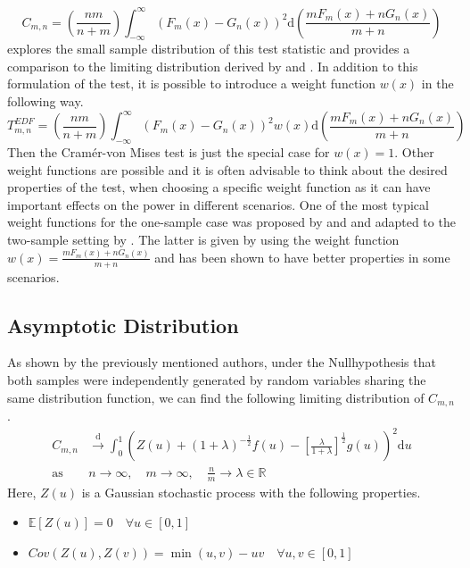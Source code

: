 \documentclass[12pt, a4paper]{article}
\theoremstyle{MAstyle} \newtheorem{assumption}{Assumption}[section]
\theoremstyle{MAstyle} \newtheorem{definition}{Definition}[section]
\theoremstyle{MAstyle} \newtheorem{theorem}{Theorem}[section]
\begin{document}
			\cite{buning_nichtparametrische_2013}
			\begin{equation}
				C_{m,n} = \left(\frac{nm}{n+m}\right) \int_{-\infty}^{\infty}\left(F_{m}(x) - G_{n}(x)\right)^{2} \mathrm{d} \left(\frac{m F_{m}(x) + n G_{n}(x)}{m+n}\right)
			\end{equation}
			\cite{anderson_distribution_1962} explores the small sample distribution of this test statistic and provides a comparison to the limiting distribution derived by \cite{rosenblatt_limit_1952} and \cite{fisz_result_1960}.
			In addition to this formulation of the test, it is possible to introduce a weight function $w(x)$ in the following way. 
			\begin{equation}
				T^{\textit{EDF}}_{m,n} = \left(\frac{nm}{n+m}\right) \int_{-\infty}^{\infty}\left(F_{m}(x) - G_{n}(x)\right)^{2} w(x) \mathrm{d} \left(\frac{m F_{m}(x) + n G_{n}(x)}{m+n}\right)
			\end{equation}
			Then the Cram\'{e}r-von Mises test is just the special case for $w(x) = 1$. Other weight functions are possible and it is often advisable to think about the desired properties of the test, when choosing a specific weight function as it can have important effects on the power in different scenarios. One of the most typical weight functions for the one-sample case was proposed by \cite{anderson_asymptotic_1952} and \cite{anderson_test_1954} and adapted to the two-sample setting by \cite{pettitt_two-sample_1976}. The latter is given by using the weight function $w(x) = \frac{m F_m(x) + n G_n(x)}{m+n}$ and has been shown to have better properties in some scenarios.
		
		\subsection{Asymptotic Distribution}
			As shown by the previously mentioned authors, under the Nullhypothesis that both samples were independently generated by random variables sharing the same distribution function, we can find the following limiting distribution of $C_{m,n}$.
			\begin{equation}
				\begin{split}
					C_{m,n} &\xrightarrow{\text{d}} \int_{0}^{1} \left(Z(u) + \left(1 + \lambda\right)^{-\frac{1}{2}} f(u) - \left[\frac{\lambda}{1+\lambda}\right]^{\frac{1}{2}}g(u)\right)^2 \mathrm{d}u \\
					\text{as} \quad &n \rightarrow \infty, \quad m \rightarrow \infty, \quad \frac{n}{m} \rightarrow \lambda \in \mathbb{R}
				\end{split}
			\end{equation}
			Here, $Z(u)$ is a Gaussian stochastic process with the following properties.
			\begin{itemize}
				\item $\mathbb{E}\left[Z(u)\right] = 0 \quad \forall u \in [0,1]$
				\item $Cov\left(Z(u), Z(v)\right) = \min(u,v) - uv \quad \forall u,v \in [0,1]$
			\end{itemize}					
			
\end{document}
